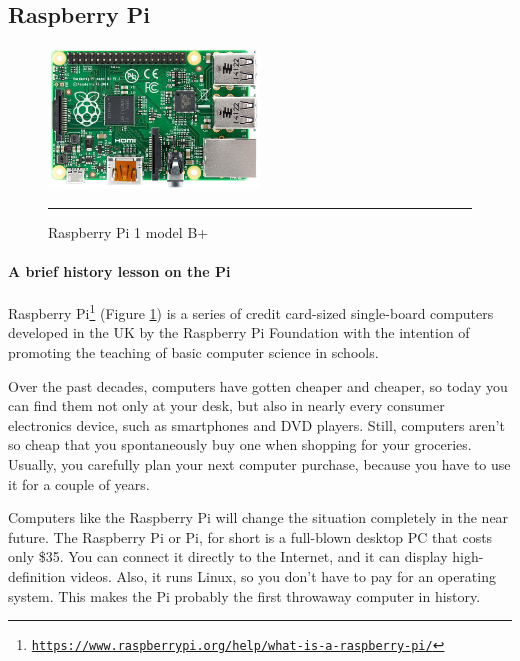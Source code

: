 \subsection{Raspberry Pi}
\begin{figure}
  \begin{center}
    \includegraphics[width=0.5\textwidth]{./Pictures/raspberry_pi_b.jpg}
  \end{center}
  \rule{0.5\textwidth}{0.5pt}
  \caption{Raspberry Pi 1 model B+}
  \label{fig:Raspberry}
\end{figure}
\paragraph*{A brief history lesson on the Pi}
\hfill \break
Raspberry Pi\footnote{\href{https://www.raspberrypi.org/help/what-is-a-raspberry-pi/}{\texttt{https://www.raspberrypi.org/help/what-is-a-raspberry-pi/}}} (Figure \ref{fig:Raspberry}) is a series of credit card-sized single-board computers developed in the UK by the Raspberry Pi Foundation with the intention of promoting the teaching of basic computer science in schools.\cite{10}

Over the past decades, computers have gotten cheaper and cheaper, so today
you can find them not only at your desk, but also in nearly every consumer
electronics device, such as smartphones and DVD players. Still, computers
aren’t so cheap that you spontaneously buy one when shopping for your
groceries. Usually, you carefully plan your next computer purchase, because
you have to use it for a couple of years.\cite{10}

Computers like the Raspberry Pi will change the situation completely in the
near future. The Raspberry Pi or Pi, for short is a full-blown desktop PC
that costs only \$35. You can connect it directly to the Internet, and it can
display high-definition videos. Also, it runs Linux, so you don’t have to pay
for an operating system. This makes the Pi probably the first throwaway
computer in history.\cite{10}

